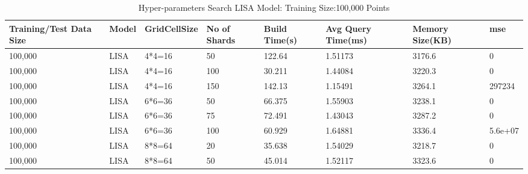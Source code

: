 \begin{table}
	\centering
	\begin{tabular}{||p{}<{\centering}|p{}<{\centering}|p{}<{\centering}| p{}<{\centering}|p{}<{\centering}|p{}<{\centering}|p{}<{\centering}|p{}<{\centering}||}
		\hline
		Training/Test Data Size& Model & GridCellSize & No of Shards & Build Time(s) & Avg Query Time(ms) & Memory Size(KB)&mse\\ [0.5ex] 
		\hline
		\hline
		\hline
		100,000& LISA& 4*4=16 & 50& 122.64& 1.51173 & 3176.6&0\\
		\hline
		100,000& LISA& 4*4=16 & 100& 30.211& 1.44084 & 3220.3&0\\
		\hline
		100,000& LISA& 4*4=16 & 150& 142.13&1.15491 & 3264.1&297234\\
		\hline
		100,000& LISA& 6*6=36 & 50& 66.375& 1.55903 & 3238.1&0\\
		\hline
		100,000& LISA& 6*6=36 & 75& 72.491& 1.43043 & 3287.2&0\\
		\hline
		100,000& LISA& 6*6=36 & 100& 60.929& 1.64881 & 3336.4&5.6e+07\\
		\hline
		100,000& LISA& 8*8=64 & 20& 35.638& 1.54029 & 3218.7&0\\
		\hline
		100,000& LISA& 8*8=64 & 50& 45.014& 1.52117 & 3323.6&0\\
		\hline
		\hline
	\end{tabular}
    \caption{Hyper-parameters Search LISA Model: Training Size:100,000 Points}
	\label{small_lognormal_lisa_100000}
\end{table}

